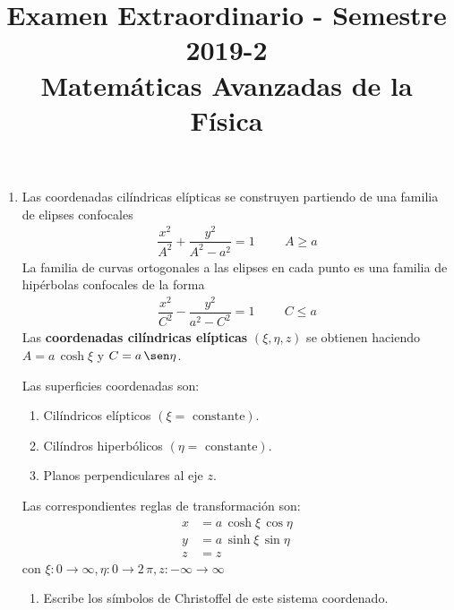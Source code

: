 
\author{}
\title{Examen Extraordinario - Semestre 2019-2  \\ \large{Matemáticas Avanzadas de la Física}} \vspace{-1.5\baselineskip}
\date{ }

\vspace{-4cm}
\renewcommand\labelenumii{\theenumi.{\arabic{enumii})}}
\maketitle
\fontsize{14}{14}\selectfont
\begin{enumerate}
    \item Las coordenadas cilíndricas elípticas se construyen partiendo de una familia de elipses confocales
    \begin{align*}
    \dfrac{x^{2}}{A^{2}} +  \dfrac{y^{2}}{A^{2} - a^{2}} =  1 \hspace{1cm} A \geq a
    \end{align*}
    La familia de curvas ortogonales a las elipses en cada punto es una familia de hipérbolas confocales de la forma
    \begin{align*}
    \dfrac{x^{2}}{C^{2}} - \dfrac{y^{2}}{a^{2} - C^{2}} = 1 \hspace{1cm} C \leq a
    \end{align*}
    Las \textbf{coordenadas cilíndricas elípticas} $(\xi, \eta, z)$ se obtienen haciendo $A = a \, \cosh \xi$ y $C = a \, \sen \eta$.
    \par
    Las superficies coordenadas son:
    \begin{enumerate}[label=\alph*)]
    \item Cilíndricos elípticos $(\xi = \mbox{ constante})$.
    \item Cilíndros hiperbólicos $(\eta = \mbox{ constante})$.
    \item Planos perpendiculares al eje $z$.
    \end{enumerate}
    Las correspondientes reglas de transformación son:
    \begin{align*}
    x &= a \, \cosh \xi \, \cos \eta \\
    y &= a \, \sinh \xi \, \sin \eta \\
    z &= z
    \end{align*}
    con $\xi: 0 \to \infty, \eta: 0 \to 2 \, \pi, z: -\infty \to \infty$
    \begin{enumerate}
    \item Escribe los símbolos de Christoffel de este sistema coordenado.

\end{enumerate}
\end{enumerate}
